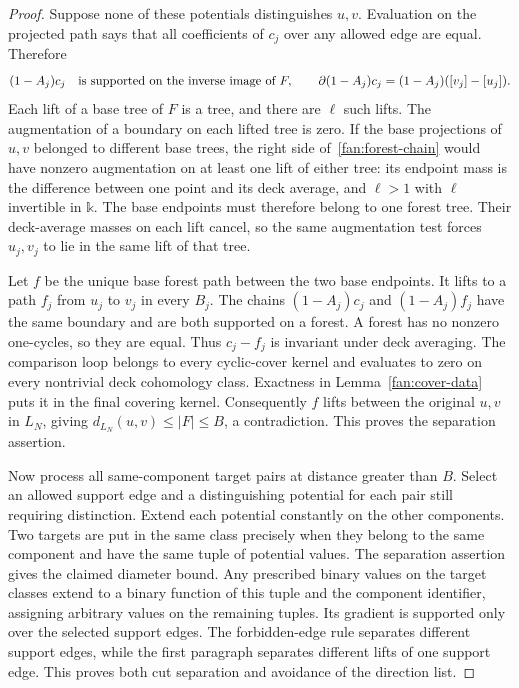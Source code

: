 \begin{proof}
Suppose none of these potentials distinguishes $u,v$.  Evaluation on
the projected path says that all coefficients of $c_j$ over any allowed
edge are equal.  Therefore
\begin{equation}\label{fan:forest-chain}
 (1-A_j)c_j\quad\hbox{is supported on the inverse image of }F,
 \qquad
 \partial(1-A_j)c_j=(1-A_j)([v_j]-[u_j]).
\end{equation}
Each lift of a base tree of $F$ is a tree, and there are $\ell$ such
lifts.  The augmentation of a boundary on each lifted tree is zero.
If the base projections of $u,v$ belonged to different base trees,
the right side of~\eqref{fan:forest-chain} would have nonzero
augmentation on at least one lift of either tree: its endpoint mass
is the difference between one point and its deck average, and
$\ell>1$ with $\ell$ invertible in $\mathbb k$.  The base endpoints
must therefore belong to one forest tree.  Their deck-average masses
on each lift cancel, so the same augmentation test forces $u_j,v_j$
to lie in the same lift of that tree.

Let $f$ be the unique base forest path between the two base endpoints.
It lifts to a path $f_j$ from $u_j$ to $v_j$ in every $B_j$.  The chains
$(1-A_j)c_j$ and $(1-A_j)f_j$ have the same boundary and are both
supported on a forest.  A forest has no nonzero one-cycles, so they
are equal.  Thus $c_j-f_j$ is invariant under deck averaging.  The
comparison loop belongs to every cyclic-cover kernel and evaluates
to zero on every nontrivial deck cohomology class.  Exactness in
Lemma~\ref{fan:cover-data} puts it in the final covering kernel.
Consequently $f$ lifts between the original $u,v$ in $L_N$, giving
$d_{L_N}(u,v)\le |F|\le B$, a contradiction.  This proves the
separation assertion.

Now process all same-component target pairs at distance greater than
$B$.  Select an allowed support edge and a distinguishing potential
for each pair still requiring distinction.  Extend each potential
constantly on the other components.  Two targets are put in the same
class precisely when they belong to the same component and have the
same tuple of potential values.  The separation assertion gives the
claimed diameter bound.  Any prescribed binary values on the target
classes extend to a binary function of this tuple and the component
identifier, assigning arbitrary values on the remaining tuples.
Its gradient is supported only over the selected support edges.
The forbidden-edge rule separates different support edges, while
the first paragraph separates different lifts of one support edge.
This proves both cut separation and avoidance of the direction list.


\end{proof}

